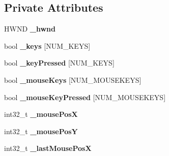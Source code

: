 \subsection*{Private Attributes}
\begin{DoxyCompactItemize}
\item 
H\+W\+ND {\bfseries \+\_\+hwnd}\hypertarget{class_ensum_1_1_input_1_1_input_a421ea6f6d448240f791aa2aa60ff4eaa}{}\label{class_ensum_1_1_input_1_1_input_a421ea6f6d448240f791aa2aa60ff4eaa}

\item 
bool {\bfseries \+\_\+keys} \mbox{[}N\+U\+M\+\_\+\+K\+E\+YS\mbox{]}\hypertarget{class_ensum_1_1_input_1_1_input_aa5dccbdacd7232a7533fe2f0956f4c36}{}\label{class_ensum_1_1_input_1_1_input_aa5dccbdacd7232a7533fe2f0956f4c36}

\item 
bool {\bfseries \+\_\+key\+Pressed} \mbox{[}N\+U\+M\+\_\+\+K\+E\+YS\mbox{]}\hypertarget{class_ensum_1_1_input_1_1_input_ac6ff4ef027802d64d495dd4aa5784b42}{}\label{class_ensum_1_1_input_1_1_input_ac6ff4ef027802d64d495dd4aa5784b42}

\item 
bool {\bfseries \+\_\+mouse\+Keys} \mbox{[}N\+U\+M\+\_\+\+M\+O\+U\+S\+E\+K\+E\+YS\mbox{]}\hypertarget{class_ensum_1_1_input_1_1_input_adf25b8364f04bbf7c35826513f814a38}{}\label{class_ensum_1_1_input_1_1_input_adf25b8364f04bbf7c35826513f814a38}

\item 
bool {\bfseries \+\_\+mouse\+Key\+Pressed} \mbox{[}N\+U\+M\+\_\+\+M\+O\+U\+S\+E\+K\+E\+YS\mbox{]}\hypertarget{class_ensum_1_1_input_1_1_input_a2677f823acfc50ba3ee0a8c18053898c}{}\label{class_ensum_1_1_input_1_1_input_a2677f823acfc50ba3ee0a8c18053898c}

\item 
int32\+\_\+t {\bfseries \+\_\+mouse\+PosX}\hypertarget{class_ensum_1_1_input_1_1_input_acfba9714a086127a683db73a112c8c56}{}\label{class_ensum_1_1_input_1_1_input_acfba9714a086127a683db73a112c8c56}

\item 
int32\+\_\+t {\bfseries \+\_\+mouse\+PosY}\hypertarget{class_ensum_1_1_input_1_1_input_a3e1cf5aeeb0333e25df6149292be04d8}{}\label{class_ensum_1_1_input_1_1_input_a3e1cf5aeeb0333e25df6149292be04d8}

\item 
int32\+\_\+t {\bfseries \+\_\+last\+Mouse\+PosX}\hypertarget{class_ensum_1_1_input_1_1_input_a40128893063305dd3f879a3d43e302d4}{}\label{class_ensum_1_1_input_1_1_input_a40128893063305dd3f879a3d43e302d4}


\end{DoxyCompactItemize}
